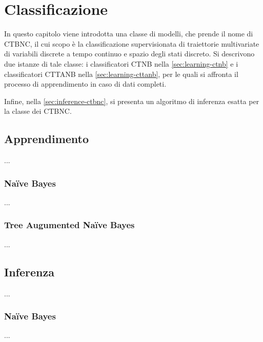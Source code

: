 
\chapter{Classificazione}
\label{cap:ctbnc}
In questo capitolo viene introdotta una classe di modelli, che prende il nome di \acf{CTBNC}, il cui scopo è la classificazione supervisionata di traiettorie multivariate di variabili discrete a tempo continuo e spazio degli stati discreto. Si descrivono due istanze di tale classe: i classificatori \acf{CTNB} nella \autoref{sec:learning-ctnb} e i classificatori \acf{CTTANB} nella \autoref{sec:learning-cttanb}, per le quali si affronta il processo di apprendimento in caso di dati completi.

Infine, nella \autoref{sec:inference-ctbnc}, si presenta un algoritmo di inferenza esatta per la classe dei \acs{CTBNC}.

\section{Apprendimento}
...

\subsection{Na\"ive Bayes}\label{sec:learning-ctnb}
...

\subsection{Tree Augumented Na\"ive Bayes}\label{sec:learning-cttanb}
...

\section{Inferenza}\label{sec:inference-ctbnc}
...

\subsection{Na\"ive Bayes}\label{sec:inference-ctnb}
...


